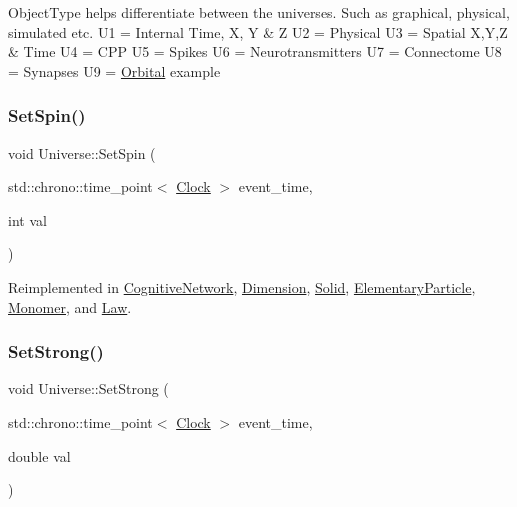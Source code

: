 Object\+Type helps differentiate between the universes. Such as graphical, physical, simulated etc. U1 = Internal Time, X, Y \& Z U2 = Physical U3 = Spatial X,Y,Z \& Time U4 = C\+PP U5 = Spikes U6 = Neurotransmitters U7 = Connectome U8 = Synapses U9 = \mbox{\hyperlink{classOrbital}{Orbital}} example\mbox{\label{classUniverse_ae2ae1c3b3e4cde2c18f5f6a814761ec8}} 
\subsubsection{\texorpdfstring{Set\+Spin()}{SetSpin()}}
{\footnotesize\ttfamily void Universe\+::\+Set\+Spin (\begin{DoxyParamCaption}\item[{std\+::chrono\+::time\+\_\+point$<$ \mbox{\hyperlink{universe_8h_a0ef8d951d1ca5ab3cfaf7ab4c7a6fd80}{Clock}} $>$}]{event\+\_\+time,  }\item[{int}]{val }\end{DoxyParamCaption})\hspace{0.3cm}{\ttfamily [virtual]}}



Reimplemented in \mbox{\hyperlink{classCognitiveNetwork_a3fc6d08413bfd4350f94d6f2627eedc7}{Cognitive\+Network}}, \mbox{\hyperlink{classDimension_a8d73c050c67b0226572b4a1b08ae6594}{Dimension}}, \mbox{\hyperlink{classSolid_a615cb8d1ec1376781726bcefa86339cb}{Solid}}, \mbox{\hyperlink{classElementaryParticle_a437fa86d88157314b84662b158d52353}{Elementary\+Particle}}, \mbox{\hyperlink{classMonomer_ad24a86a4c1ac62d1b0ce8040d6b08adf}{Monomer}}, and \mbox{\hyperlink{classLaw_a3de75edea5e20db0a7b731de61f07dea}{Law}}.

\mbox{\label{classUniverse_a5946c8f3d4cda305f3ecd10df21a2f94}} 
\subsubsection{\texorpdfstring{Set\+Strong()}{SetStrong()}}
{\footnotesize\ttfamily void Universe\+::\+Set\+Strong (\begin{DoxyParamCaption}\item[{std\+::chrono\+::time\+\_\+point$<$ \mbox{\hyperlink{universe_8h_a0ef8d951d1ca5ab3cfaf7ab4c7a6fd80}{Clock}} $>$}]{event\+\_\+time,  }\item[{double}]{val }\end{DoxyParamCaption})\hspace{0.3cm}{\ttfamily [virtual]}}



